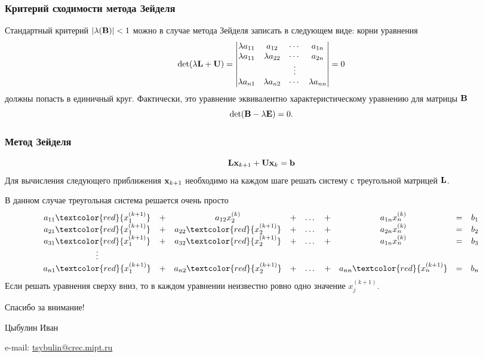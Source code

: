 \documentclass[apectratio=43,unicode]{beamer}
\newcommand{\colorhref}[2]{\href{#1}{\textcolor{miptbase!30!black}{#2}}}
\begin{document}
\begin{frame}\frametitle{Критерий сходимости метода Зейделя}
	Стандартный критерий $|\lambda(\mathbf{B})| < 1$ можно в случае метода Зейделя
записать в следующем виде: корни уравнения
	\[
		\operatorname{det} (\lambda \mathbf{L} + \mathbf{U}) =
		\begin{vmatrix}
			\lambda a_{11} & a_{12} & \cdots & a_{1n}\\
			\lambda a_{11} & \lambda a_{22} & \cdots & a_{2n}\\
			&&\vdots\\
			\lambda a_{n1} & \lambda a_{n2} & \cdots & \lambda a_{nn}\\
		\end{vmatrix} = 0
	\]
	должны попасть в единичный круг. Фактически, это уравнение эквивалентно
характеристическому уравнению для матрицы $\mathbf{B}$
	\[
		\operatorname{det}(\mathbf{B} - \lambda \mathbf{E}) = 0.
	\]
\end{frame}

\begin{frame}\frametitle{Метод Зейделя}
	$$
	\mathbf{L} \mathbf{x}_{k+1} + \mathbf{U} \mathbf{x}_k = \mathbf{b}
	$$
	Для вычисления следующего приближения $\mathbf{x}_{k+1}$ необходимо на каждом шаге решать систему с треугольной матрицей $\mathbf{L}$. 

	В данном случае треугольная система решается очень просто
	\begin{equation*}
	\begin{array}{ccccccccc}
	a_{11} \textcolor{red}{x^{(k+1)}_{1}} &+& a_{12} x^{(k)}_{2}  &+& \dots &+& a_{1n} x^{(k)}_{n} &=& b_1\\
	a_{21} \textcolor{red}{x^{(k+1)}_{1}} &+& a_{22} \textcolor{red}{x^{(k+1)}_{2}} &+& \dots &+& a_{2n} x^{(k)}_{n} &=& b_2\\
	a_{31} \textcolor{red}{x^{(k+1)}_{1}} &+& a_{32}
\textcolor{red}{x^{(k+1)}_{2}} &+& \dots &+& a_{1n} x^{(k)}_{n} &=& b_3\\
	\vdots\\
	a_{n1} \textcolor{red}{x^{(k+1)}_{1}} &+& a_{n2}
\textcolor{red}{x^{(k+1)}_{2}} &+& \dots &+& a_{nn}
\textcolor{red}{x^{(k+1)}_{n}} &=& b_n
	\end{array}
	\end{equation*}
	Если решать уравнения сверху вниз, то в каждом уравнении неизвестно ровно
одно значение $x^{(k+1)}_{j}$.
\end{frame}
\begin{frame}[plain]
  \begin{center}
  {\Huge Спасибо за внимание!}
  \vspace{8ex}

  Цыбулин Иван

  e-mail: \colorhref{mailto:tsybulin@crec.mipt.ru}{tsybulin@crec.mipt.ru}
  \end{center}
\end{frame}
\end{document}
